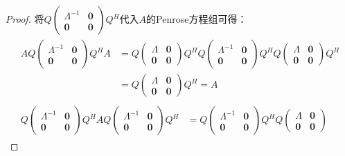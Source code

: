 \begin{proof}
	将$Q
	\begin{pmatrix}
		\varLambda^{-1} & \mathbf{0} \\
		\mathbf{0} & \mathbf{0}
	\end{pmatrix}Q^H$代入$A$的Penrose方程组可得：
	\begin{gather*}
		\begin{aligned}
			AQ
			\begin{pmatrix}
				\varLambda^{-1} & \mathbf{0} \\
				\mathbf{0} & \mathbf{0}
			\end{pmatrix}Q^HA
			&=Q
			\begin{pmatrix}
				\varLambda & \mathbf{0} \\
				\mathbf{0} & \mathbf{0}
			\end{pmatrix}
			Q^HQ
			\begin{pmatrix}
				\varLambda^{-1} & \mathbf{0} \\
				\mathbf{0} & \mathbf{0}
			\end{pmatrix}
			Q^HQ
			\begin{pmatrix}
				\varLambda & \mathbf{0} \\
				\mathbf{0} & \mathbf{0}
			\end{pmatrix}
			Q^H \\
			&=Q
			\begin{pmatrix}
				\varLambda & \mathbf{0} \\
				\mathbf{0} & \mathbf{0}
			\end{pmatrix}
			Q^H
			=A
		\end{aligned} \\
		\begin{aligned}
			Q
			\begin{pmatrix}
				\varLambda^{-1} & \mathbf{0} \\
				\mathbf{0} & \mathbf{0}
			\end{pmatrix}
			Q^HAQ
			\begin{pmatrix}
				\varLambda^{-1} & \mathbf{0} \\
				\mathbf{0} & \mathbf{0}
			\end{pmatrix}
			Q^H
			&=Q
			\begin{pmatrix}
				\varLambda^{-1} & \mathbf{0} \\
				\mathbf{0} & \mathbf{0}
			\end{pmatrix}
			Q^HQ
			\begin{pmatrix}
				\varLambda & \mathbf{0} \\
				\mathbf{0} & \mathbf{0}
			\end{pmatrix}

\end{aligned}
\end{gather*}
\end{proof}
